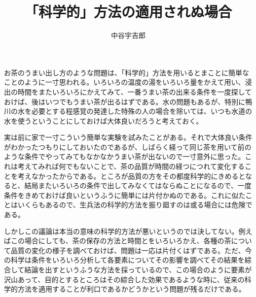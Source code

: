 \documentclass{article}
\begin{document}
\title{「科学的」方法の適用されぬ場合}
\author{中谷宇吉郎}

\maketitle

お茶のうまい出し方のような問題は、「科学的」方法を用いるとまことに簡単なことのように一寸思われる。いろいろの温度の湯をいろいろ量をかえて用い、浸出の時間をまたいろいろにかえてみて、一番うまい茶の出来る条件を一度探しておけば、後はいつでもうまい茶が出るはずである。水の問題もあるが、特別に鴨川の水を必要とする程感覚の発達した特殊の人の場合を除いては、いつも水道の水を使うということにしておけば大体良いだろうと考えておく。

実は前に家で一寸こういう簡単な実験を試みたことがある。それで大体良い条件がわかったつもりにしておいたのであるが、しばらく経って同じ茶を用いて前のような条件でやってみてもなかなかうまい茶が出ないので一寸意外に思った。これは考えてみれば何でもないことで、茶の品質が時間の経つにつれて変化することを考えなかったからである。ところが品質の方をその都度科学的にきめるとなると、結局またいろいろの条件で出してみなくてはならぬことになるので、一度条件をきめておけば良いというふうに簡単には片付かぬのである。これに似たことはいくらもあるので、生兵法の科学的方法を振り廻すのは或る場合には危険である。

しかしこの議論は本当の意味の科学的方法が悪いというのでは決してない。例えばこの場合にしても、茶の保存の方法と時間とをいろいろかえ、各種の茶について品質の変化の様子を調べておけば、問題は一応は片付くはずである。ただ、今の科学は条件をいろいろ分析して各要素についてその影響を調べてその結果を綜合して結論を出すというふうな方法を採っているので、この場合のように要素が沢山あって、目的とするところはその綜合した効果であるような時に、従来の科学的方法を適用することが利口であるかどうかという問題が残るだけである。
\end{document}
